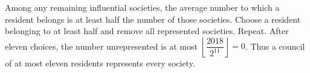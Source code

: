 Among any remaining influential societies, the average number to which a resident belongs is at least half the number of those societies. Choose a resident belonging to at least half and remove all represented societies. Repeat. After eleven choices, the number unrepresented is at most $\left\lfloor\dfrac{2018}{2^{11}}\right\rfloor=0$. Thus a council of at most eleven residents represents every society.
